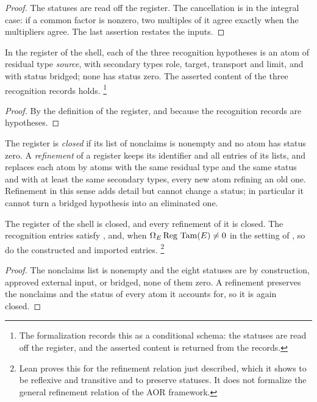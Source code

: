 \begin{proof}
The statuses are read off the register.  The cancellation is
\citet[Section~13]{TsiokosBSDApparatus2026} in the integral case: if a
common factor is nonzero, two multiples of it agree exactly when the
multipliers agree.  The last assertion restates the inputs.
\end{proof}

\begin{theorem}\label{thm:closure:aor-recognition-discharge}
In the register of the shell, each of the three recognition hypotheses is
an atom of residual type \emph{source}, with secondary types role,
target, transport and limit, and with status bridged; none has status
zero.  The asserted content of the three recognition records holds.%
\footnote{The formalization records this as a conditional schema: the
statuses are read off the register, and the asserted content is returned
from the records.}
\end{theorem}

\begin{proof}
By the definition of the register, and because the recognition records
are hypotheses.
\end{proof}

The register is \emph{closed} if its list of nonclaims is nonempty and no
atom has status zero.  A \emph{refinement} of a register keeps its
identifier and all entries of its lists, and replaces each atom by atoms
with the same residual type and the same status and with at least the
same secondary types, every new atom refining an old one.  Refinement in
this sense adds detail but cannot change a status; in particular it cannot
turn a bridged hypothesis into an eliminated one.

\begin{theorem}\label{thm:closure:aor-instance}
The register of the shell is closed, and every refinement of it is
closed.  The recognition entries satisfy
, and, when
$\Omega_E\operatorname{Reg}\,\operatorname{Tam}(E)\neq0$ in the setting of
, so do the constructed and
imported entries.%
\footnote{Lean proves this for the refinement relation just described,
which it shows to be reflexive and transitive and to preserve statuses.
It does not formalize the general refinement relation of the AOR
framework.}
\end{theorem}

\begin{proof}
The nonclaims list is nonempty and the eight statuses are by
construction, approved external input, or bridged, none of them zero.  A
refinement preserves the nonclaims and the status of every atom it
accounts for, so it is again closed.
\end{proof}

